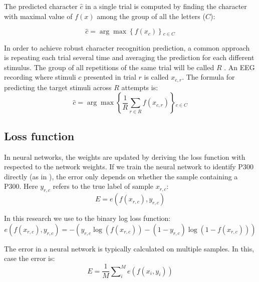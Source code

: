 \documentclass[
12pt, %
english, %
doublespacing, %
headsepline, %
]{MastersDoctoralThesis} %
\begin{document}
The predicted character $\hat{c}$ in a single trial is computed by finding the character with maximal value of $f(x)$ among the group of all the letters ($C$):


\begin{equation}
\hat{c} = \arg \max \left\{ {f\left( {{x_{c}}} \right)} \right\}{  _{c \in C}}
\end{equation}

In order to achieve robust character recognition prediction, a common approach is repeating each trial several time and averaging the prediction for each different stimulus. The group of all repetitions of the same trial will be called $R$ . An EEG recording where stimuli $c$ presented in trial $r$ is called $x_{c,r}$. The formula for predicting the target stimuli across $R$ attempts is:
\begin{equation}
\hat c = \arg \max \left\{ {\frac{1}{R}\sum\limits_{r \in R}^{} {f\left( {{x_{c,r}}} \right)} } \right\}{_{c \in C}}
\end{equation}

\subsection{Loss function}
In neural networks, the weights are updated by deriving the loss function with respected to the network weights. If we train the neural network to identify P300 directly (as in \cite{P300_CNN}), the error only depends on whether the sample containing a P300. Here $y_{r,c}$ refers to the true label of sample $x_{r,c}$:
\begin{equation}
E = e\left( {f\left( {{x_{r,c}}} \right),{y_{r,c}}} \right)
\end{equation} 

In this research we use to the binary log loss function:
\begin{equation}\label{eq:binary_log_loss}
e\left( {f\left( {{x_{r,c}}} \right),{y_{r,c}}} \right) =  - \left( {{y_{r,c}}\log \left( {f\left( {{x_{r,c}}} \right)} \right) - \left( {1 - {y_{r,c}}} \right)\log \left( {1 - f\left( {{x_{r,c}}} \right)} \right)} \right)
\end{equation} 


The error in a neural network is typically calculated on multiple samples. In this, case the error is:
\begin{equation}\label{eq:mini_batch_loss}
E = \frac{1}{M}\sum\nolimits_i^M {e\left( {f\left( {{x_i},{y_i}} \right)} \right)}
\end{equation}
\end{document}
